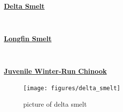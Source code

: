 \documentclass[
]{book}
\begin{document}
\begin{panel-grid}

\begin{columns-nocenter}

\begin{column800}

\textbf{\href{http://calfish.ucdavis.edu/species/?uid=47\&ds=698}{Delta Smelt}}

\end{column800}

\begin{column40}

~

\end{column40}

\begin{column800}

\textbf{\href{http://calfish.ucdavis.edu/species/?uid=87\&ds=698}{Longfin Smelt}}

\end{column800}

\begin{column40}

~

\end{column40}

\begin{column800}

\textbf{\href{http://calfish.ucdavis.edu/species/?uid=30\&ds=698}{Juvenile Winter-Run Chinook}}

\end{column800}

\end{columns-nocenter}

\begin{columns-nocenter}

\begin{column800}

\begin{figure}

{\centering \texttt{[image: figures/delta\_smelt]} 

}

\caption{picture of delta smelt}\label{fig:unnamed-chunk-179}
\end{figure}

\end{column800}

\begin{column40}

~

\end{column40}


\end{columns-nocenter}
\end{panel-grid}
\end{document}
